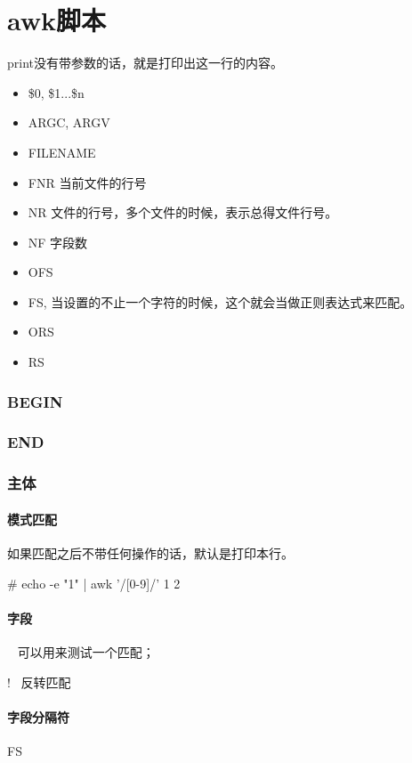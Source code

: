 \section{awk脚本}

print没有带参数的话，就是打印出这一行的内容。

\begin{itemize}
\item \$0, \$1...\$n
\item ARGC, ARGV
\item FILENAME
\item FNR 当前文件的行号
\item NR 文件的行号，多个文件的时候，表示总得文件行号。
\item NF 字段数
\item OFS
\item FS, 当设置的不止一个字符的时候，这个就会当做正则表达式来匹配。
\item ORS
\item RS

\end{itemize}


\subsubsection*{BEGIN}

\subsubsection{END}

\subsubsection{主体}

\paragraph{模式匹配}

如果匹配之后不带任何操作的话，默认是打印本行。

\begin{Command-Line}
# echo -e "1" | awk '/[0-9]/'
1
2
\end{Command-Line}

\paragraph{字段}


~ 可以用来测试一个匹配；

!~ 反转匹配

\paragraph{字段分隔符} FS